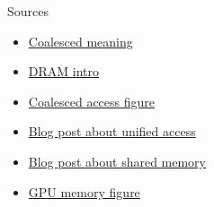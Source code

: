 \documentclass[11pt,t]{beamer}
\begin{document}
\begin{frame}{Sources}

\begin{itemize}
    \item \href{https://www.oxfordlearnersdictionaries.com/definition/english/coalesce?q=coalesced}{Coalesced meaning} 
    \item \href{https://www.youtube.com/watch?app=desktop&v=I-9XWtdW_Co}{DRAM intro}
    \item \href{https://www.researchgate.net/publication/265849053_A_GPU_Accelerated_Algorithm_for_Blood_Detection_inWireless_Capsule_Endoscopy_Images}{Coalesced access figure}
    \item \href{https://developer.nvidia.com/blog/unified-memory-cuda-beginners/}{Blog post about unified access}
    \item \href{https://developer.nvidia.com/blog/using-shared-memory-cuda-cc/}{Blog post about shared memory}
    \item \href{https://giahuy04.medium.com/memory-types-in-gpu-6373b7a0ca47}{GPU memory figure}
\end{itemize}

\end{frame}
\end{document}
